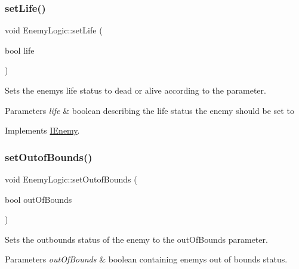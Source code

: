 \subsubsection{\texorpdfstring{set\+Life()}{setLife()}}
{\footnotesize\ttfamily void Enemy\+Logic\+::set\+Life (\begin{DoxyParamCaption}\item[{bool}]{life }\end{DoxyParamCaption})\hspace{0.3cm}{\ttfamily [virtual]}}



Sets the enemy\textquotesingle{}s life status to dead or alive according to the parameter. 


\begin{DoxyParams}{Parameters}
{\em life} & boolean describing the life status the enemy should be set to \\
\hline
\end{DoxyParams}


Implements \hyperlink{class_i_enemy}{I\+Enemy}.

\mbox{\label{class_enemy_logic_a0ac79ee7c0acf99b27aa4e22f98ce2d1}} 
\subsubsection{\texorpdfstring{set\+Outof\+Bounds()}{setOutofBounds()}}
{\footnotesize\ttfamily void Enemy\+Logic\+::set\+Outof\+Bounds (\begin{DoxyParamCaption}\item[{bool}]{out\+Of\+Bounds }\end{DoxyParamCaption})}



Sets the outbounds status of the enemy to the out\+Of\+Bounds parameter. 


\begin{DoxyParams}{Parameters}
{\em out\+Of\+Bounds} & boolean containing enemy\textquotesingle{}s out of bounds status. \\
\hline
\end{DoxyParams}
\mbox{\label{class_enemy_logic_acabb2cb226edc71300ba1f2bc3e7a577}} 
